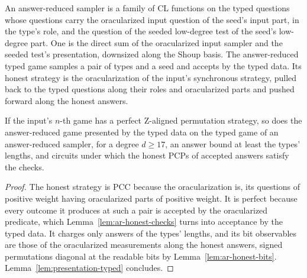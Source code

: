 \begin{definition}
\label{def:ar-honest-strategy}
\leanok
An answer-reduced sampler is a family of CL functions on the typed questions whose questions carry
the oracularized input question of the seed's input part, in the type's role, and the question of
the seeded low-degree test of the seed's low-degree part. One is the direct sum of the
oracularized input sampler and the seeded test's presentation, downsized along the Shoup basis.
The answer-reduced typed game samples a pair of types and a seed and accepts by the typed data.
Its honest strategy is the oracularization of the input's synchronous strategy, pulled back to
the typed questions along their roles and oracularized parts and pushed forward along the honest
answers.
\end{definition}

\begin{theorem}
\label{thm:ar-zpc-complete}
\leanok
If the input's $n$-th game has a perfect Z-aligned permutation strategy, so does the
answer-reduced game presented by the typed data on the typed game of an answer-reduced sampler,
for a degree $d \geq 17$, an answer bound at least the types' lengths, and circuits under which the
honest PCPs of accepted answers satisfy the checks.
\end{theorem}

\begin{proof}
\leanok
The honest strategy is PCC because the oracularization is, its questions of positive weight
having oracularized parts of positive weight. It is perfect because every outcome it produces at
such a pair is accepted by the oracularized predicate, which Lemma~\ref{lem:ar-honest-checks} turns
into acceptance by the typed data. It charges only answers of the types' lengths, and its bit
observables are those of the oracularized measurements along the honest answers, signed
permutations diagonal at the readable bits by Lemma~\ref{lem:ar-honest-bits}.
Lemma~\ref{lem:presentation-typed} concludes.
\end{proof}

